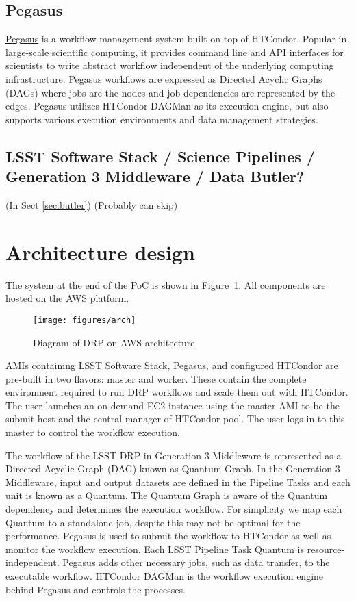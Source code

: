 \subsection{Pegasus}
\href{https://pegasus.isi.edu/}{Pegasus}\citep{deelman-fgcs-2015} is a workflow management system built on top of HTCondor.
Popular in large-scale scientific computing, it provides command line and API interfaces for scientists to write abstract workflow independent of the underlying computing infrastructure.
Pegasus workflows are expressed as Directed Acyclic Graphs (DAGs) where jobs are the nodes and job dependencies are represented by the edges.
Pegasus utilizes HTCondor DAGMan as its execution engine, but also supports various execution environments and data management strategies.
\subsection{LSST Software Stack / Science Pipelines / Generation 3 Middleware / Data Butler?}
(In Sect \ref{sec:butler})
(Probably can skip)

\section{Architecture design}


The system at the end of the PoC is shown in Figure~\ref{fig:arch}.
All components are hosted on the AWS platform.

\begin{figure}
  \centering
  \texttt{[image: figures/arch]}
  \label{fig:arch}
  \caption{Diagram of DRP on AWS architecture.}
\end{figure}

AMIs containing LSST Software Stack, Pegasus, and configured HTCondor are pre-built in two flavors: master and worker. These contain the complete environment required to run DRP workflows and scale them out with HTCondor. The user launches an on-demand EC2 instance using the master AMI to be the submit host and the central manager of HTCondor pool.
The user logs in to this master to control the workflow execution.

The workflow of the LSST DRP in Generation 3 Middleware is represented as a Directed Acyclic Graph (DAG) known as Quantum Graph.
In the Generation 3 Middleware, input and output datasets are defined in the Pipeline Tasks and each unit is known as a Quantum.
The Quantum Graph is aware of the Quantum dependency and determines the execution workflow.
For simplicity we map each Quantum to a standalone job, despite this may not be optimal for the performance.
Pegasus is used to submit the workflow to HTCondor as well as monitor the workflow execution.
Each LSST Pipeline Task Quantum is resource-independent. Pegasus adds other necessary jobs, such as data transfer, to the executable workflow. HTCondor DAGMan is the workflow execution engine behind Pegasus and controls the processes.

